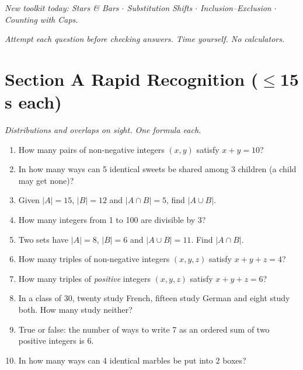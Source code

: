 \documentclass[11pt,a4paper]{article}
\begin{document}
\noindent\textit{New toolkit today: Stars \& Bars $\cdot$ Substitution Shifts $\cdot$ Inclusion--Exclusion $\cdot$ Counting with Caps.}

\vspace{2pt}
\noindent\textit{Attempt each question before checking answers. Time yourself. No calculators.}

\section*{Section A \quad Rapid Recognition \hfill{\normalfont\small($\leq$15 s each)}}

\noindent\textit{Distributions and overlaps on sight. One formula each.}

\begin{enumerate}

\item How many pairs of non-negative integers $(x,y)$ satisfy $x+y=10$?

\item In how many ways can 5 identical sweets be shared among 3 children (a child may get none)?

\item Given $|A|=15$, $|B|=12$ and $|A\cap B|=5$, find $|A\cup B|$.

\item How many integers from 1 to 100 are divisible by 3?

\item Two sets have $|A|=8$, $|B|=6$ and $|A\cup B|=11$. Find $|A\cap B|$.

\item How many triples of non-negative integers $(x,y,z)$ satisfy $x+y+z=4$?

\item How many triples of \emph{positive} integers $(x,y,z)$ satisfy $x+y+z=6$?

\item In a class of 30, twenty study French, fifteen study German and eight study both. How many study neither?

\item True or false: the number of ways to write 7 as an ordered sum of two positive integers is 6.

\item In how many ways can 4 identical marbles be put into 2 boxes?

\end{enumerate}
\end{document}
